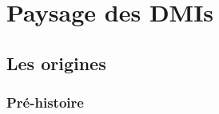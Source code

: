 \clearpage

\section{Paysage des DMIs}
\label{sec:ephemerality:landscape}

\subsection{Les origines}
\label{sec:ephemeral:origins}

\subsubsection{Pré-histoire}
\label{sec:ephemeral:origins:prehistory}

